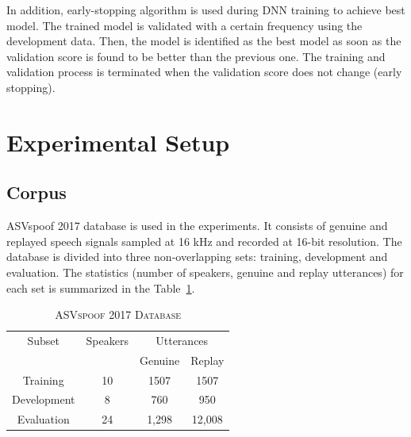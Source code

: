 \documentclass{article}
\begin{document}
In addition, early-stopping algorithm is used during DNN training to achieve best model. The trained model is
validated with a certain frequency using the development data. Then, the model is identified as the best model as soon
as the validation score is found to be better than the previous one. The training and validation process is terminated
when the validation score does not change (early stopping).

\section{Experimental Setup}
\label{experimental_setup}
\subsection{Corpus}
\label{sec:corpus}

ASVspoof 2017 database \cite{kinnunen2017reddots} is used in the experiments. It consists of genuine and replayed
speech signals sampled at 16 kHz and recorded at 16-bit resolution. The database is divided into three non-overlapping
sets: training, development and evaluation. The  statistics (number of speakers, genuine and replay utterances) for
each set is summarized in the Table~\ref{database}.

\begin{table}[ph]
    \centering
    \caption{\textsc{ASVspoof 2017 Database \cite{kinnunen2017reddots}}}
    \vspace{2mm}
    \label{database}
    \begin{tabular}{|c|c|cc|}
        \hline
        Subset      & Speakers & \multicolumn{2}{|c|}{Utterances}          \\
                    &          & Genuine                          & Replay \\
        \hline
        Training    & 10       & 1507                             & 1507   \\
        Development & 8        & 760                              & 950    \\
        Evaluation  & 24       & 1,298                            & 12,008 \\
        \hline
    \end{tabular}
\end{table}
\end{document}
